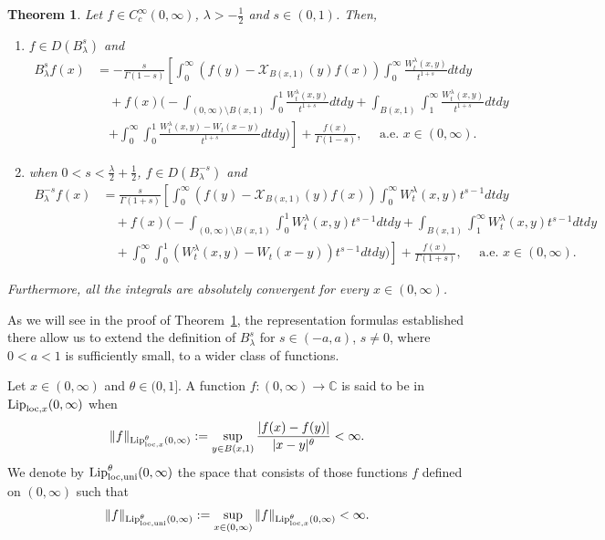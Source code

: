 \documentclass[a4paper,10pt, reqno]{amsart}
\newtheorem{thm}{Theorem}[section]
\theoremstyle{definition}
\theoremstyle{remark}
\numberwithin{equation}{section}
\begin{document}
\begin{thm}\label{thm: Th1.1}
Let $f\in C_c^\infty (0,\infty)$, $\lambda >-\tfrac12$ and $s\in (0,1)$. Then,
\begin{enumerate}
\item \label{itm: Th1.1 a} $f\in D(B_\lambda^s)$ and
\begin{align*}
    B_\lambda^sf(x)&=-\frac{s}{\Gamma (1-s)}\left[\int_0^\infty \left(f(y)-\mathcal X_{B(x,1)}(y)f(x)\right)\int_0^\infty \frac{W_t^\lambda (x,y)}{t^{1+s}}dtdy\right.\\
    &\quad +f(x)\Bigg(-\int_{(0,\infty)\setminus B(x,1)}\int_0^1\frac{W_t^\lambda (x,y)}{t^{1+s}}dtdy+\int_{B(x,1)}\int_1^\infty \frac{W_t^\lambda (x,y)}{t^{1+s}}dtdy\\
    &\quad \left.+\int_0^\infty \int_0^1\frac{W_t^\lambda (x,y)-W_t(x-y)}{t^{1+s}}dtdy\Bigg)\right]+\frac{f(x)}{\Gamma (1-s)},\quad \mbox{ a.e. }x\in (0,\infty). 
\end{align*}
\item \label{itm: Th1.1 b} when $0<s<\frac{\lambda}{2}+\frac{1}{2}$, $f\in D(B_\lambda^{-s})$ and
\begin{align*}
    B_\lambda^{-s}f(x)&=\frac{s}{\Gamma (1+s)}\left[\int_0^\infty \left(f(y)-\mathcal X_{B(x,1)}(y)f(x)\right)\int_0^\infty W_t^\lambda (x,y)t^{s-1}dtdy\right.\\
    &\quad +f(x)\Bigg(-\int_{(0,\infty)\setminus B(x,1)}\int_0^1W_t^\lambda (x,y)t^{s-1}dtdy+\int_{B(x,1)}\int_1^\infty W_t^\lambda (x,y)t^{s-1}dtdy\\
    &\quad +\left.\int_0^\infty \int_0^1(W_t^\lambda (x,y)-W_t(x-y))t^{s-1}dtdy\Bigg)\right]+\frac{f(x)}{\Gamma (1+s)},\quad \mbox{ a.e. }x\in (0,\infty).    
\end{align*}
\end{enumerate}
Furthermore, all the integrals are absolutely convergent for every $x\in (0,\infty)$.
\end{thm}
As we will see in the proof of Theorem~\ref{thm: Th1.1}, the representation formulas established there allow us to extend the definition of $B_\lambda^s$ for $s\in (-a,a)$, $s\neq 0$, where $0<a<1$ is sufficiently small, to a wider class of functions. 

Let $x\in (0,\infty)$ and $\theta\in (0,1]$. A function $f:(0,\infty)\rightarrow \mathbb{C}$ is said to be in ${\textup{Lip}}_{{\rm loc},x}(0,\infty)$ when
\[\|f\|_{{\textup{Lip}}^\theta_{{\rm loc},x}(0,\infty)}:=\sup_{y\in B(x,1)}\frac{|f(x)-f(y)|}{|x-y|^\theta}<\infty.
\]
We denote by ${\textup{Lip}}^\theta_{{\rm loc},{\rm uni}}(0,\infty)$ the space that consists of those functions $f$ defined on $(0,\infty)$ such that
\[
\|f\|_{{\textup{Lip}}^\theta_{{\rm loc},{\rm uni}}(0,\infty)}:=\sup_{x\in (0,\infty)}\|f\|_{{\textup{Lip}}^\theta_{{\rm loc},x}(0,\infty)}<\infty.
\]
\end{document}
